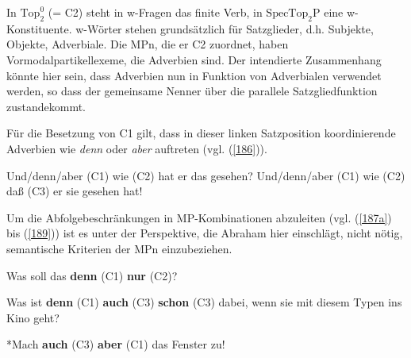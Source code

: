 In $\textrm{Top}^{0}_{2}$ (= C2) steht in w-Fragen  das finite Verb, in $\textrm{SpecTop}_{2}\textrm{P}$ eine w-Konstitu\-ente. w-Wörter stehen grundsätzlich für Satzglieder, d.h. Subjekte, Objekte, Adverbiale. Die MPn, die er C2 zuordnet, haben Vormodalpartikellexeme, die Adverbien  sind. Der intendierte Zusammenhang könnte hier sein, dass Adverbien nun in Funktion von Adverbialen verwendet werden, so dass der gemeinsame Nenner über die parallele Satzgliedfunktion zustandekommt. 

Für die Besetzung von C1 gilt, dass in dieser linken Satzposition koordinierende Adverbien wie \textit{denn} oder \textit{aber} auftreten (vgl. (\ref{186})).

\begin{exe}
	\ex\label{186} 
		\begin{xlist}	
			\ex\label{186a} Und/denn/aber (C1) wie (C2) hat er das gesehen?
			\ex\label{186b} Und/denn/aber (C1) wie (C2) daß (C3) er sie gesehen hat!
		\end{xlist}
	\hfill\hbox{\citet[106]{Abraham1995}}	
\end{exe}
Um die Abfolgebeschränkungen in MP-Kombinationen abzuleiten (vgl. (\ref{187a}) bis (\ref{189})) ist es unter der Perspektive, die Abraham hier einschlägt, nicht nötig, semantische Kriterien der MPn einzubeziehen. 

\begin{exe}
	\ex\label{187a} 
	Was soll das \textbf{denn} (C1) \textbf{nur} (C2)?
\end{exe}
\vspace{-0.65cm}
\begin{exe}
	\ex\label{187} 
	Was ist \textbf{denn} (C1) \textbf{auch} (C3) \textbf{schon} (C3) dabei, wenn sie mit diesem Typen ins Kino geht?
\end{exe}
\vspace{-0.65cm}
\begin{exe}
	\ex\label{189} 
	*Mach \textbf{auch} (C3) \textbf{aber} (C1) das Fenster zu!
	\hfill\hbox {\citet[286-287]{Thurmair1989}}
\end{exe}												    		   

